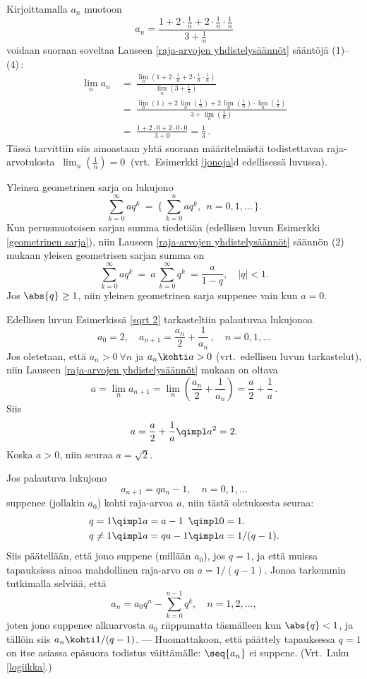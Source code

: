 \ratk Kirjoittamalla $a_n$ muotoon
\[
a_n = \frac{1 + 2 \cdot \tfrac{1}{n} + 2 \cdot \tfrac{1}{n} \cdot \tfrac{1}{n}}{3 + \tfrac{1}{n}}
\]
voidaan suoraan soveltaa Lauseen \ref{raja-arvojen yhdistelysäännöt} sääntöjä (1)--(4)\,:
\begin{align*}
\lim_n a_n\ &=\ \frac{\lim_n(1 + 2 \cdot \tfrac{1}{n} 
              + 2 \cdot \tfrac{1}{n} \cdot \tfrac{1}{n})}{\lim_n(3 + \tfrac{1}{n})} \\
            &=\ \frac{\lim_n(1) + 2\,\lim_n(\tfrac{1}{n}) 
              + 2\,\lim_n(\tfrac{1}{n}) \cdot \lim_n(\tfrac{1}{n})}{3 + \lim_n(\tfrac{1}{n})} \\
            &=\ \frac{1 + 2 \cdot 0 + 2 \cdot 0 \cdot 0}{3 + 0} = \frac{1}{3}\,.
\end{align*}
Tässä tarvittiin siis ainoastaan yhtä suoraan määritelmästä todistettavaa raja-arvotulosta
$\ \lim_n (\tfrac{1}{n}) = 0\ $ (vrt.\ Esimerkki \ref{jonoja}d edellisessä luvussa). \loppu

\begin{Exa} Yleinen geometrinen sarja on lukujono 
\[
\sum_{k=0}^{\infty} aq^k\ =\ \{\,\sum_{k=0}^n aq^k,\ \ n=0,1, \ldots\,\}. 
\]
Kun perusmuotoisen sarjan summa tiedetään (edellisen luvun Esimerkki \ref{geometrinen sarja}),
niin Lauseen \ref{raja-arvojen yhdistelysäännöt} säännön (2) mukaan yleisen geometrisen
sarjan summa on
\[
\sum_{k=0}^{\infty} aq^k\ =\ a\,\sum_{k=0}^{\infty} q^k\ = \frac{a}{1-q}, \quad |q|<1.
\]
Jos $\abs{q} \ge 1$, niin yleinen geometrinen sarja suppenee vain kun $a=0$. \loppu 
\end{Exa}
\begin{Exa} Edellisen luvun Esimerkissä \ref{sqrt 2} tarkasteltiin palautuvaa lukujonoa
\[
a_0 = 2, \quad a_{n+1} = \frac{a_n}{2} + \frac{1}{a_n}\,, \quad n = 0,1,\ldots
\] 
Jos oletetaan, että $a_n>0\ \forall n$ ja $a_n \kohti a>0$ (vrt.\ edellisen luvun tarkastelut),
niin Lauseen \ref{raja-arvojen yhdistelysäännöt} mukaan on oltava
\[
a = \lim_n a_{n+1} = \lim_n \left(\frac{a_n}{2} + \frac{1}{a_n}\right) 
                   = \frac{a}{2} + \frac{1}{a}\,.
\]
Siis
\[
a = \frac{a}{2} + \frac{1}{a} \qimpl a^2 = 2.
\]
Koska $a>0$, niin seuraa $a=\sqrt{2}$.  \loppu
\end{Exa}
\begin{Exa} Jos palautuva lukujono
\[
a_{n+1} = qa_n - 1, \quad n=0,1,\ldots
\]
suppenee (jollakin $a_0$) kohti raja-arvoa $a$, niin tästä oletuksesta seuraa:
\begin{align*}
q=1     &\qimpl a=a-1  \,\ \qimpl 0=1. \\
q\neq 1 &\qimpl a=qa-1 \qimpl a=1/(q-1).
\end{align*}
Siis päätellään, että jono  suppene (millään $a_0$), jos $q=1$, ja että muissa
tapauksissa ainoa mahdollinen raja-arvo on $a=1/(q-1)$. Jonoa tarkemmin tutkimalla selviää, että 
\[
a_n = a_0 q^n - \sum_{k=0}^{n-1} q^k, \quad n=1,2,\ldots,
\]
joten jono suppenee alkuarvosta $a_0$ riippumatta täsmälleen kun $\abs{q}<1$, ja tällöin siis
$a_n \kohti 1/(q-1)$. --- Huomattakoon, että päättely tapauksessa $q=1$ on itse asiassa epäsuora
todistus väittämälle: $\seq{a_n}$ ei suppene. (Vrt.\ Luku \ref{logiikka}.) \loppu
\end{Exa}

